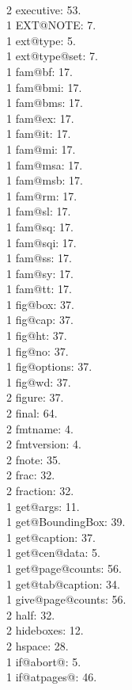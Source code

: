 \\2 executive: 53.
\\1 EXT@NOTE: 7.
\\1 ext@type: 5.
\\1 ext@type@set: 7.
\\1 fam@bf: 17.
\\1 fam@bmi: 17.
\\1 fam@bms: 17.
\\1 fam@ex: 17.
\\1 fam@it: 17.
\\1 fam@mi: 17.
\\1 fam@msa: 17.
\\1 fam@msb: 17.
\\1 fam@rm: 17.
\\1 fam@sl: 17.
\\1 fam@sq: 17.
\\1 fam@sqi: 17.
\\1 fam@ss: 17.
\\1 fam@sy: 17.
\\1 fam@tt: 17.
\\1 fig@box: 37.
\\1 fig@cap: 37.
\\1 fig@ht: 37.
\\1 fig@no: 37.
\\1 fig@options: 37.
\\1 fig@wd: 37.
\\2 figure: 37.
\\2 final: 64.
\\2 fmtname: 4.
\\2 fmtversion: 4.
\\2 fnote: 35.
\\2 frac: 32.
\\2 fraction: 32.
\\1 get@args: 11.
\\1 get@BoundingBox: 39.
\\1 get@caption: 37.
\\1 get@cen@data: 5.
\\1 get@page@counts: 56.
\\1 get@tab@caption: 34.
\\1 give@page@counts: 56.
\\2 half: 32.
\\2 hideboxes: 12.
\\2 hspace: 28.
\\1 if@abort@: 5.
\\1 if@atpages@: 46.

